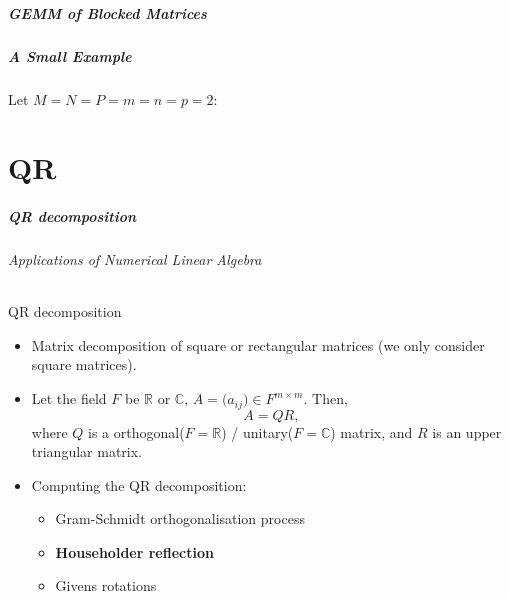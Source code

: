\begin{frame}
\frametitle{GEMM of Blocked Matrices}
\frametitle{A Small Example}
Let \(M = N = P = m = n = p = 2\):
\vspace{0.3cm}
\begin{center}
\end{center}
\end{frame}

\part{QR}
\makepart

\begin{frame}
\frametitle{QR decomposition}
\framesubtitle{Applications of Numerical Linear Algebra}
QR decomposition
\begin{itemize}
 \item Matrix decomposition of square or rectangular matrices (we only consider square matrices).
 \item Let the field \(F\) be \(\mathbb{R}\) or \(\mathbb{C}\), \(A =\big( a_{ij} \big) \in F^{m \times m}\). Then,
 \begin{equation}
  A = QR,
 \end{equation}
 where \(Q\) is a orthogonal(\(F=\mathbb{R}\)) / unitary(\(F=\mathbb{C}\)) matrix, and \(R\) is an upper triangular matrix.
 \item Computing the QR decomposition:
 \begin{itemize}
  \item Gram-Schmidt orthogonalisation process
  \item \textbf{Householder reflection}
  \item Givens rotations
 \end{itemize}
\end{itemize}
\end{frame}

